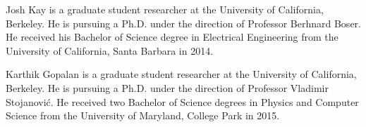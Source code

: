 \documentclass[journal]{IEEEtran}
\begin{document}



% 
\begin{IEEEbiography}{Josh Kay}
is a graduate student researcher at the University of California, Berkeley. He is pursuing a Ph.D. under the direction of Professor Berhnard Boser. He received his Bachelor of Science degree in Electrical Engineering from the University of California, Santa Barbara in 2014.
\end{IEEEbiography}

\begin{IEEEbiography}{Karthik Gopalan}
is a graduate student researcher at the University of California, Berkeley. He is pursuing a Ph.D. under the direction of Professor Vladimir Stojanovi\'{c}. He received two Bachelor of Science degrees in Physics and Computer Science from the University of Maryland, College Park in 2015.
\end{IEEEbiography}
\end{document}
